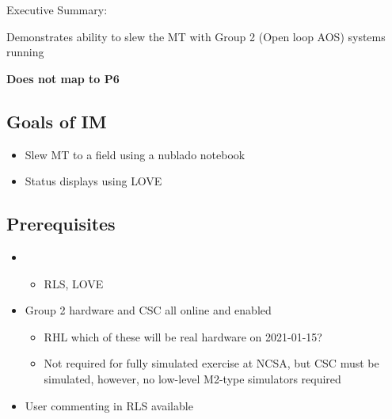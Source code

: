 
Executive Summary:

Demonstrates ability to slew the MT with Group 2 (Open loop AOS) systems running

\textbf{Does not map to P6}

\subsection{Goals of IM}
\begin{itemize}
\item Slew \gls{MT} to a field using a nublado notebook
\item Status displays using \gls{LOVE}
\end{itemize}

\subsection{Prerequisites}
\begin{itemize}
\item{}
  \begin{itemize}
  \item \gls{RLS}, \gls{LOVE}
  \end{itemize}
\item{Group 2 hardware and \gls{CSC} all online and enabled}
  \begin{itemize}
  \item RHL which of these will be real hardware on 2021-01-15?
  \item Not required for fully simulated exercise at NCSA, but \gls{CSC} must be simulated,
    however, no low-level M2-type simulators required
  \end{itemize}
\item{User commenting in \gls{RLS} available}
\end{itemize}

